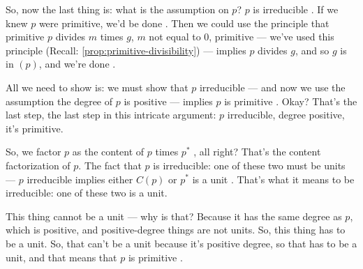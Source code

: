 \begin{proofWrapper}
\begin{hidden}
\end{hidden}

\begin{speech}[00:37:11 - 00:39:17]
So, now the last thing is: what is the assumption on $p$? $p$ is irreducible . If we knew $p$ were primitive, we'd be done . Then we could use the principle that primitive $p$ divides $m$ times $g$, $m$ not equal to $0$, primitive --- we've used this principle (Recall: \cref{prop:primitive-divisibility})  --- implies $p$ divides $g$, and so $g$ is in $(p)$, and we're done .

All we need to show is: we must show that $p$ irreducible --- and now we use the assumption the degree of $p$ is positive --- implies $p$ is primitive . Okay? That's the last step, the last step in this intricate argument: $p$ irreducible, degree positive, it's primitive.

So, we factor $p$ as the content of $p$ times $p^*$ , all right? That's the content factorization of $p$. The fact that $p$ is irreducible: one of these two must be units --- $p$ irreducible implies either $C(p)$ or $p^*$ is a unit . That's what it means to be irreducible: one of these two is a unit.

This thing  cannot be a unit --- why is that? Because it has the same degree as $p$, which is positive, and positive-degree things are not units. So, this thing  has to be a unit. So, that can't be a unit because it's positive degree, so that has to be a unit, and that means that $p$ is primitive .


\end{speech}
\end{proofWrapper}
